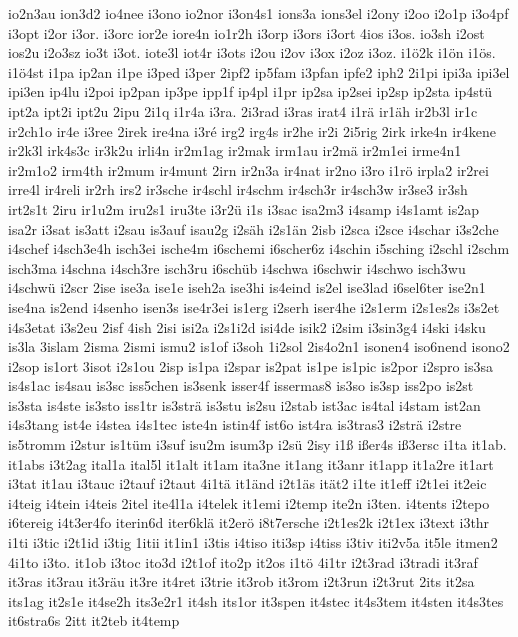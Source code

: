 {io2n3au
ion3d2
io4nee
i3ono
io2nor
i3on4s1
ions3a
ions3el
i2ony
i2oo
i2o1p
i3o4pf
i3opt
i2or
i3or.
i3orc
ior2e
iore4n
io1r2h
i3orp
i3ors
i3ort
4ios
i3os.
io3sh
i2ost
ios2u
i2o3sz
io3t
i3ot.
iote3l
iot4r
i3ots
i2ou
i2ov
i3ox
i2oz
i3oz.
i1ö2k
i1ön
i1ös.
i1ö4st
i1pa
ip2an
i1pe
i3ped
i3per
2ipf2
ip5fam
i3pfan
ipfe2
iph2
2i1pi
ipi3a
ipi3el
ipi3en
ip4lu
i2poi
ip2pan
ip3pe
ipp1f
ip4pl
i1pr
ip2sa
ip2sei
ip2sp
ip2sta
ip4stü
ipt2a
ipt2i
ipt2u
2ipu
2i1q
i1r4a
i3ra.
2i3rad
i3ras
irat4
i1rä
ir1äh
ir2b3l
ir1c
ir2ch1o
ir4e
i3ree
2irek
ire4na
i3ré
irg2
irg4s
ir2he
ir2i
2i5rig
2irk
irke4n
ir4kene
ir2k3l
irk4s3c
ir3k2u
irli4n
ir2m1ag
ir2mak
irm1au
ir2mä
ir2m1ei
irme4n1
ir2m1o2
irm4th
ir2mum
ir4munt
2irn
ir2n3a
ir4nat
ir2no
i3ro
i1rö
irpla2
ir2rei
irre4l
ir4reli
ir2rh
irs2
ir3sche
ir4schl
ir4schm
ir4sch3r
ir4sch3w
ir3se3
ir3sh
irt2s1t
2iru
ir1u2m
iru2s1
iru3te
i3r2ü
i1s
i3sac
isa2m3
i4samp
i4s1amt
is2ap
isa2r
i3sat
is3att
i2sau
is3auf
isau2g
i2säh
i2s1än
2isb
i2sca
i2sce
i4schar
i3s2che
i4schef
i4sch3e4h
isch3ei
ische4m
i6schemi
i6scher6z
i4schin
i5sching
i2schl
i2schm
isch3ma
i4schna
i4sch3re
isch3ru
i6schüb
i4schwa
i6schwir
i4schwo
isch3wu
i4schwü
i2scr
2ise
ise3a
ise1e
iseh2a
ise3hi
is4eind
is2el
ise3lad
i6sel6ter
ise2n1
ise4na
is2end
i4senho
isen3s
ise4r3ei
is1erg
i2serh
iser4he
i2s1erm
i2s1es2s
i3s2et
i4s3etat
i3s2eu
2isf
4ish
2isi
isi2a
i2s1i2d
isi4de
isik2
i2sim
i3sin3g4
i4ski
i4sku
is3la
3islam
2isma
2ismi
ismu2
is1of
i3soh
1i2sol
2is4o2n1
isonen4
iso6nend
isono2
i2sop
is1ort
3isot
i2s1ou
2isp
is1pa
i2spar
is2pat
is1pe
is1pic
is2por
i2spro
is3sa
is4s1ac
is4sau
is3sc
iss5chen
is3senk
isser4f
issermas8
is3so
is3sp
iss2po
is2st
is3sta
is4ste
is3sto
iss1tr
is3strä
is3stu
is2su
i2stab
ist3ac
is4tal
i4stam
ist2an
i4s3tang
ist4e
i4stea
i4s1tec
iste4n
istin4f
ist6o
ist4ra
is3tras3
i2strä
i2stre
is5tromm
i2stur
is1tüm
i3suf
isu2m
isum3p
i2sü
2isy
i1ß
ißer4s
iß3ersc
i1ta
it1ab.
it1abs
i3t2ag
ital1a
ital5l
it1alt
it1am
ita3ne
it1ang
it3anr
it1app
it1a2re
it1art
i3tat
it1au
i3tauc
i2tauf
i2taut
4i1tä
it1änd
i2t1äs
ität2
i1te
it1eff
i2t1ei
it2eic
i4teig
i4tein
i4teis
2itel
ite4l1a
i4telek
it1emi
i2temp
ite2n
i3ten.
i4tents
i2tepo
i6tereig
i4t3er4fo
iterin6d
iter6klä
it2erö
i8t7ersche
i2t1es2k
i2t1ex
i3text
i3thr
i1ti
i3tic
i2t1id
i3tig
1itii
it1in1
i3tis
i4tiso
iti3sp
i4tiss
i3tiv
iti2v5a
it5le
itmen2
4i1to
i3to.
it1ob
i3toc
ito3d
i2t1of
ito2p
it2os
i1tö
4i1tr
i2t3rad
i3tradi
it3raf
it3ras
it3rau
it3räu
it3re
it4ret
i3trie
it3rob
it3rom
i2t3run
i2t3rut
2its
it2sa
its1ag
it2s1e
it4se2h
its3e2r1
it4sh
its1or
it3spen
it4stec
it4s3tem
it4sten
it4s3tes
it6stra6s
2itt
it2teb
it4temp
}

